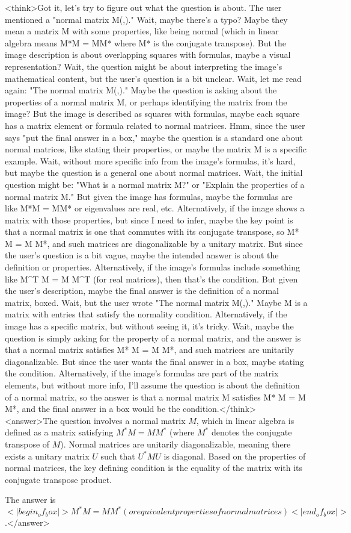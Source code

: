 <think>Got it, let's try to figure out what the question is about. The user mentioned a "normal matrix M(,)." Wait, maybe there's a typo? Maybe they mean a matrix M with some properties, like being normal (which in linear algebra means M*M = MM* where M* is the conjugate transpose). But the image description is about overlapping squares with formulas, maybe a visual representation? Wait, the question might be about interpreting the image's mathematical content, but the user's question is a bit unclear. Wait, let me read again: "The normal matrix M(,)." Maybe the question is asking about the properties of a normal matrix M, or perhaps identifying the matrix from the image? But the image is described as squares with formulas, maybe each square has a matrix element or formula related to normal matrices. Hmm, since the user says "put the final answer in a box," maybe the question is a standard one about normal matrices, like stating their properties, or maybe the matrix M is a specific example. Wait, without more specific info from the image's formulas, it's hard, but maybe the question is a general one about normal matrices. Wait, the initial question might be: "What is a normal matrix M?" or "Explain the properties of a normal matrix M." But given the image has formulas, maybe the formulas are like M*M = MM* or eigenvalues are real, etc. Alternatively, if the image shows a matrix with those properties, but since I need to infer, maybe the key point is that a normal matrix is one that commutes with its conjugate transpose, so M* M = M M*, and such matrices are diagonalizable by a unitary matrix. But since the user's question is a bit vague, maybe the intended answer is about the definition or properties. Alternatively, if the image's formulas include something like M^T M = M M^T (for real matrices), then that's the condition. But given the user's description, maybe the final answer is the definition of a normal matrix, boxed. Wait, but the user wrote "The normal matrix M(,)." Maybe M is a matrix with entries that satisfy the normality condition. Alternatively, if the image has a specific matrix, but without seeing it, it's tricky. Wait, maybe the question is simply asking for the property of a normal matrix, and the answer is that a normal matrix satisfies M* M = M M*, and such matrices are unitarily diagonalizable. But since the user wants the final answer in a box, maybe stating the condition. Alternatively, if the image's formulas are part of the matrix elements, but without more info, I'll assume the question is about the definition of a normal matrix, so the answer is that a normal matrix M satisfies M* M = M M*, and the final answer in a box would be the condition.</think><answer>The question involves a normal matrix \( M \), which in linear algebra is defined as a matrix satisfying \( M^* M = M M^* \) (where \( M^* \) denotes the conjugate transpose of \( M \)). Normal matrices are unitarily diagonalizable, meaning there exists a unitary matrix \( U \) such that \( U^* M U \) is diagonal. Based on the properties of normal matrices, the key defining condition is the equality of the matrix with its conjugate transpose product.  

The answer is \(<|begin_of_box|>M^* M = M M^* (or equivalent properties of normal matrices)<|end_of_box|>\).</answer>